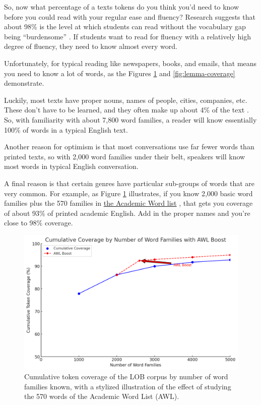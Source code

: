 So, now what percentage of a texts tokens do you think you'd need to know before you could read with your regular ease and fluency? Research suggests that about 98\% is the level at which students can read without the vocabulary gap being ``burdensome'' \citep{Hu2000}. If students want to read for fluency with a relatively high degree of fluency, they need to know almost every word.

Unfortunately, for typical reading like newspapers, books, and emails, that means you need to know a lot of words, as the Figures \ref{fig:AWL boost} and \ref{fig:lemma-coverage} demonstrate.

Luckily, most texts have proper nouns, names of people, cities, companies, etc. These don't have to be learned, and they often make up about 4\% of the text \citep[29]{Nation2013}. So, with familiarity with about 7,800 word families, a reader will know essentially 100\% of words in a typical English text.

Another reason for optimism is that most conversations use far fewer words than printed texts, so with 2,000 word families under their belt, speakers will know most words in typical English conversation.

A final reason is that certain genres have particular sub-groups of words that are very common. For example, as Figure \ref{fig:AWL boost} illustrates, if you know 2,000 basic word families plus the 570 families in \href{https://simple.wiktionary.org/wiki/Wiktionary:Academic_word_list}{the Academic Word list} \citep{coxhead2000academic}, that gets you coverage of about 93\% of printed academic English. Add in the proper names and you're close to 98\% coverage.

\begin{figure}
    \centering
    \includegraphics[width=0.8\linewidth]{figures/AWLboost.png}
    \caption{Cumulative token coverage of the LOB corpus by number of word families known, with a stylized illustration of the effect of studying the 570 words of the Academic Word List (AWL).}
    \label{fig:AWL boost}
\end{figure}

